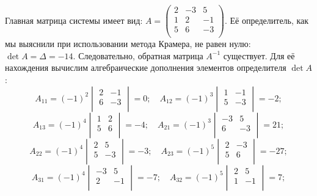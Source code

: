 \documentclass[10pt]{article}
\numberwithin{primer}{section}
\numberwithin{equation}{section}
\begin{document}
Главная матрица системы имеет вид:
$A=\begin{pmatrix}
2 & -3 & 5 \\
1 & 2 & -1 \\
5 & 6 & -3\\
\end{pmatrix}$. Её определитель, как мы выяснили при использовании метода Крамера, не равен нулю: $\det A =\Delta=-14$.
Следовательно, обратная матрица $A^{-1}$ существует. Для её нахождения вычислим алгебраические дополнения элементов определителя $\det A$:
\begin{equation*}
A_{11}=(-1)^2\begin{vmatrix}
2 & -1 \\
6 & -3 \\
\end{vmatrix}=0;\quad A_{12}=(-1)^3\begin{vmatrix}
1 & -1 \\
5 & -3 \\
\end{vmatrix}=-2;
\end{equation*}
\begin{equation*}
A_{13}=(-1)^4\begin{vmatrix}
1 & 2 \\
5 & 6 \\
\end{vmatrix}=-4;\quad A_{21}=(-1)^3\begin{vmatrix}
-3 & 5 \\
6 & -3 \\
\end{vmatrix}=21;
\end{equation*}
\begin{equation*}
A_{22}=(-1)^4\begin{vmatrix}
2 & 5\\
5 & -3 \\
\end{vmatrix}=-3;\quad A_{23}=(-1)^5\begin{vmatrix}
2 & -3 \\
5 & 6 \\
\end{vmatrix}=-27;
\end{equation*}
\begin{equation*}
A_{31}=(-1)^4\begin{vmatrix}
-3& 5\\
2& -1 \\
\end{vmatrix}=-7;\quad A_{32}=(-1)^5\begin{vmatrix}
2 & 5 \\
1 & -1 \\
\end{vmatrix}=7;
\end{equation*}
\end{document}
